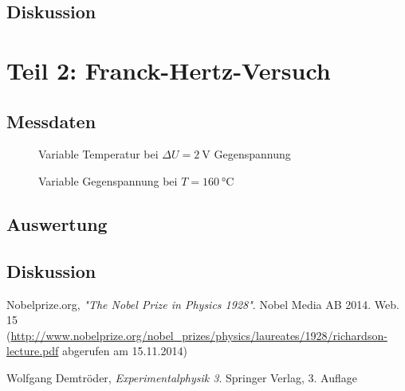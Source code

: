 \documentclass[11pt, a4paper]{article}
\begin{document}
\subsection{Diskussion}

\section{Teil 2: Franck-Hertz-Versuch}

\subsection{Messdaten}

\begin{figure}[h]
\centering

\caption{Variable Temperatur bei $\Delta U=\SI{2}{\volt}$ Gegenspannung}
\label{fig:fh_vartemp}
\end{figure}

\begin{figure}[h]
\centering

\caption{Variable Gegenspannung bei $T=\SI{160}{\degreeCelsius}$}
\label{fig:fh_varvolt}
\end{figure}

\subsection{Auswertung}

\subsection{Diskussion}


\begin{thebibliography}{9}

 Nobelprize.org,
 \emph{"The Nobel Prize in Physics 1928"}.
 Nobel Media AB 2014. Web. 15\\
 (\url{http://www.nobelprize.org/nobel_prizes/physics/laureates/1928/richardson-lecture.pdf} abgerufen am 15.11.2014)
  
	Wolfgang Demtröder,
	\emph{Experimentalphysik 3}.
	Springer Verlag,
	3. Auflage
\end{thebibliography}

\newpage

\begin{appendix}

\end{appendix}
\end{document}
